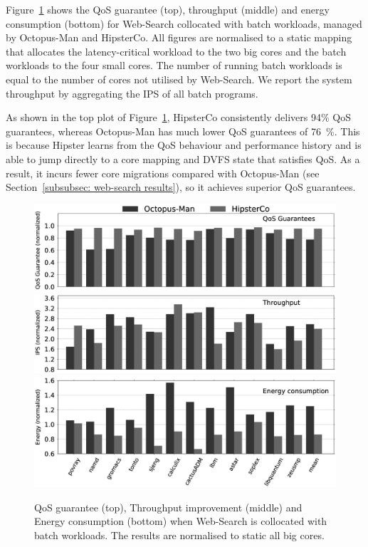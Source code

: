 Figure~\ref{fig:coallocaaaa} shows the QoS guarantee (top), throughput (middle) and energy
consumption (bottom) for Web-Search collocated with batch workloads, managed by
Octopus-Man and HipsterCo. All figures are normalised to a static mapping that allocates
the latency-critical workload to the two big cores and the batch workloads to the four
small cores. The number of running batch workloads is equal to the number of cores not
utilised by Web-Search. We report the system throughput by aggregating the IPS of all
batch programs. 

As shown in the top plot of Figure~\ref{fig:coallocaaaa}, HipsterCo consistently delivers
94\% QoS guarantees, whereas Octo\-pus-Man has much lower QoS guarantees of
\SI{76}{\percent}. This is because Hipster learns from the QoS behaviour and performance
history and is able to jump directly to a core mapping and DVFS state that satisfies QoS.
As a result, it incurs fewer core migrations compared with  Octopus-Man (see
Section~\ref{subsubsec: web-search results}), so it achieves superior QoS guarantees. 

\begin{figure}[ht]
    \centering
    \includegraphics[width=0.9\linewidth]{Chapter4/Figs/guarantees_throughput_coalloc_without_yaxis.eps}
    \includegraphics[width=0.9\linewidth]{Chapter4/Figs/throughput_coalloc_without_legend_axis.eps}
    \includegraphics[width=0.9\linewidth]{Chapter4/Figs/energy_coalloc_withoutlegend.eps}

    \caption[Collocation of interactive and batch workloads with HipsterCo]{ QoS guarantee (top), Throughput improvement (middle) and Energy consumption (bottom) when Web-Search is collocated with batch workloads. The results are normalised to static all big cores. }

\label{fig:coallocaaaa}
\end{figure} 


